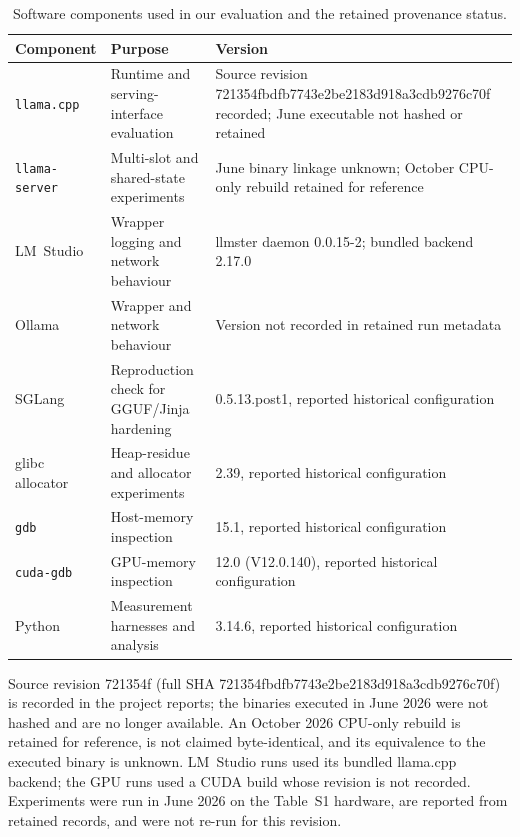 \begin{table}[!t]
    \centering
    \caption{Software components used in our evaluation and the retained provenance status.}
    \label{tab:software_config}
    \footnotesize
    \setlength{\tabcolsep}{4pt}
    \begin{tabular}{llp{7cm}}
        \toprule
        \textbf{Component} &
        \textbf{Purpose} &
        \textbf{Version} \\
        \midrule
        \texttt{llama.cpp} &
        Runtime and serving-interface evaluation &
        Source revision 721354fbdfb7743e2be\allowbreak2183d918a3cdb9276c70f recorded; June executable not hashed or retained \\
        \texttt{llama-server} &
        Multi-slot and shared-state experiments &
        June binary linkage unknown; October CPU-only rebuild retained for reference \\
        LM~Studio &
        Wrapper logging and network behaviour &
        llmster daemon 0.0.15-2; bundled backend 2.17.0 \\
        Ollama &
        Wrapper and network behaviour &
        Version not recorded in retained run metadata \\
        SGLang &
        Reproduction check for GGUF/Jinja hardening &
        0.5.13.post1, reported historical configuration \\
        glibc allocator &
        Heap-residue and allocator experiments &
        2.39, reported historical configuration \\
        \texttt{gdb} &
        Host-memory inspection &
        15.1, reported historical configuration \\
        \texttt{cuda-gdb} &
        GPU-memory inspection &
        12.0 (V12.0.140), reported historical configuration \\
        Python &
        Measurement harnesses and analysis &
        3.14.6, reported historical configuration \\
        \bottomrule
    \end{tabular}
\end{table}
Source revision 721354f (full SHA
721354fbdfb7743e2be\allowbreak2183d918a3cdb9276c70f) is recorded in the project
reports; the binaries executed in June 2026 were not hashed and are no
longer available. An October 2026 CPU-only rebuild is retained for
reference, is not claimed byte-identical, and its equivalence to the
executed binary is unknown. LM~Studio runs used its bundled llama.cpp
backend; the GPU runs used a CUDA build whose revision is not recorded.
Experiments were run in June 2026 on the Table~S1 hardware, are reported
from retained records, and were not re-run for this revision.

